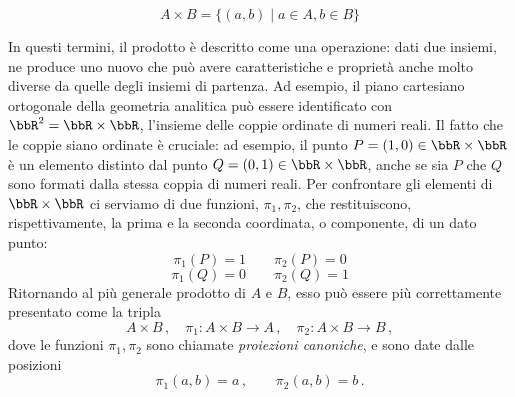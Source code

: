 \[
	A\times B= \{(a,b)\mid a\in A, b\in B\}
\]

In questi termini, il prodotto è descritto come una operazione: dati due insiemi, ne produce uno nuovo che può avere caratteristiche e proprietà anche molto diverse da quelle degli insiemi di partenza. Ad esempio, il piano cartesiano ortogonale della geometria analitica può essere identificato con \(\bbR^2=\bbR\times\bbR\), l'insieme delle coppie ordinate di numeri reali. Il fatto che le coppie siano ordinate è cruciale: ad esempio, il punto \(P=(1,0)\in \bbR\times\bbR\) è un elemento distinto dal punto \(Q=(0,1)\in \bbR\times\bbR\), anche se sia $P$ che $Q$ sono formati dalla stessa coppia di numeri reali. Per confrontare gli elementi di \(\bbR\times\bbR\) ci serviamo di due funzioni, \(\pi_1,\pi_2\), che restituiscono, rispettivamente, la prima e la seconda coordinata, o componente, di un dato punto:
\[
	\pi_1(P)=1\qquad \pi_2(P)=0
\]
\[
	\pi_1(Q)=0\qquad \pi_2(Q)=1
\]
Ritornando al più generale prodotto di \(A\) e \(B\), esso può essere più correttamente presentato come la tripla
\[
	A\times B\,,\quad \pi_1\colon A\times B\to A\,,\quad \pi_2\colon A\times B\to B\,,
\]
dove le funzioni \(\pi_1,\pi_2\) sono chiamate \emph{proiezioni canoniche}, e sono date dalle posizioni
\[
	\pi_1(a,b)=a\,,\qquad \pi_2(a,b)=b\,.
\]

